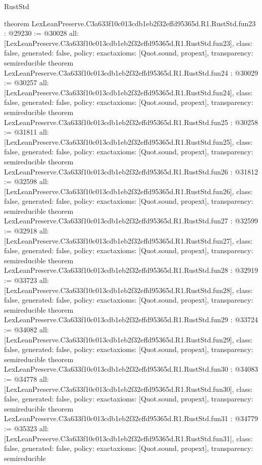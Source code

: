 \begin{lexlean}{RustStd}
\begin{coremodule}
{}
theorem LexLeanPreserve.C3a633f10c013cdb1eb2f32effd95365d.R1.RustStd.fun23 : @29230 := @30028 {
  all: [LexLeanPreserve.C3a633f10c013cdb1eb2f32effd95365d.R1.RustStd.fun23],
  class: false,
  generated: false,
  policy: exact{axioms: [Quot.sound, propext]},
  transparency: semireducible
}
theorem LexLeanPreserve.C3a633f10c013cdb1eb2f32effd95365d.R1.RustStd.fun24 : @30029 := @30257 {
  all: [LexLeanPreserve.C3a633f10c013cdb1eb2f32effd95365d.R1.RustStd.fun24],
  class: false,
  generated: false,
  policy: exact{axioms: [Quot.sound, propext]},
  transparency: semireducible
}
theorem LexLeanPreserve.C3a633f10c013cdb1eb2f32effd95365d.R1.RustStd.fun25 : @30258 := @31811 {
  all: [LexLeanPreserve.C3a633f10c013cdb1eb2f32effd95365d.R1.RustStd.fun25],
  class: false,
  generated: false,
  policy: exact{axioms: [Quot.sound, propext]},
  transparency: semireducible
}
theorem LexLeanPreserve.C3a633f10c013cdb1eb2f32effd95365d.R1.RustStd.fun26 : @31812 := @32598 {
  all: [LexLeanPreserve.C3a633f10c013cdb1eb2f32effd95365d.R1.RustStd.fun26],
  class: false,
  generated: false,
  policy: exact{axioms: [Quot.sound, propext]},
  transparency: semireducible
}
theorem LexLeanPreserve.C3a633f10c013cdb1eb2f32effd95365d.R1.RustStd.fun27 : @32599 := @32918 {
  all: [LexLeanPreserve.C3a633f10c013cdb1eb2f32effd95365d.R1.RustStd.fun27],
  class: false,
  generated: false,
  policy: exact{axioms: [Quot.sound, propext]},
  transparency: semireducible
}
theorem LexLeanPreserve.C3a633f10c013cdb1eb2f32effd95365d.R1.RustStd.fun28 : @32919 := @33723 {
  all: [LexLeanPreserve.C3a633f10c013cdb1eb2f32effd95365d.R1.RustStd.fun28],
  class: false,
  generated: false,
  policy: exact{axioms: [Quot.sound, propext]},
  transparency: semireducible
}
theorem LexLeanPreserve.C3a633f10c013cdb1eb2f32effd95365d.R1.RustStd.fun29 : @33724 := @34082 {
  all: [LexLeanPreserve.C3a633f10c013cdb1eb2f32effd95365d.R1.RustStd.fun29],
  class: false,
  generated: false,
  policy: exact{axioms: [Quot.sound, propext]},
  transparency: semireducible
}
theorem LexLeanPreserve.C3a633f10c013cdb1eb2f32effd95365d.R1.RustStd.fun30 : @34083 := @34778 {
  all: [LexLeanPreserve.C3a633f10c013cdb1eb2f32effd95365d.R1.RustStd.fun30],
  class: false,
  generated: false,
  policy: exact{axioms: [Quot.sound, propext]},
  transparency: semireducible
}
theorem LexLeanPreserve.C3a633f10c013cdb1eb2f32effd95365d.R1.RustStd.fun31 : @34779 := @35323 {
  all: [LexLeanPreserve.C3a633f10c013cdb1eb2f32effd95365d.R1.RustStd.fun31],
  class: false,
  generated: false,
  policy: exact{axioms: [Quot.sound, propext]},
  transparency: semireducible
}
\end{coremodule}
\end{lexlean}
